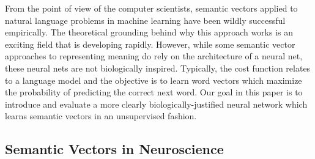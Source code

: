 \documentclass[12pt, usenames]{article}
\theoremstyle{definition}
\theoremstyle{definition}
\theoremstyle{definition}
\begin{document}
From the point of view of the computer scientists, semantic vectors applied to natural language problems in machine learning have been wildly successful empirically. The theoretical grounding behind why this approach works is an exciting field that is developing rapidly. However, while some semantic vector approaches to representing meaning do rely on the architecture of a neural net, these neural nets are not biologically inspired. Typically, the cost function relates to a language model and the objective is to learn word vectors which maximize the probability of predicting the correct next word. Our goal in this paper is to introduce and evaluate a more clearly biologically-justified neural network which learns semantic vectors in an unsupervised fashion.

\subsection{Semantic Vectors in Neuroscience}
\end{document}
